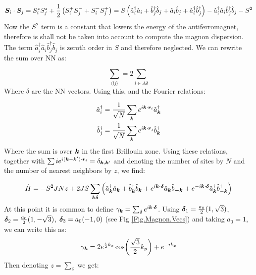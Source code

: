 \begin{align*}
\boldsymbol{S}_i\cdot\boldsymbol{S}_j = S_i^zS_j^z + \frac{1}{2}\left(S_i^+S_j^- + S_i^-S_j^+ \right) = S \left( \hat{a}^\dagger_i \hat{a}_i + \hat{b}^\dagger_j \hat{b}_j + \hat{a}_i\hat{b}_j + \hat{a}^\dagger_i\hat{b}^\dagger_j \right) - \hat{a}^\dagger_i \hat{a}_i\hat{b}^\dagger_j \hat{b}_j - S^2
\end{align*}
Now the $S^2$ term is a constant that lowers the energy of the antiferromagnet, therefore is shall not be taken into account to compute the magnon dispersion. The term $\hat{a}^\dagger_i \hat{a}_i\hat{b}^\dagger_j \hat{b}_j$ is zeroth order in $S$ and therefore neglected. We can rewrite the sum over NN as:

\begin{equation}
\sum_{\langle i j \rangle} = 2\sum_{i \in A \delta}
\end{equation}
Where $\delta$ are the NN vectors. Using this, and the Fourier relations:

\begin{align}
\hat{a}_i^\dagger &= \frac{1}{\sqrt{N}} \sum_{\boldsymbol{k}} e^{i \boldsymbol{k} \cdot \boldsymbol{r}_i} \hat{a}_{\boldsymbol{k}}^\dagger \\
\hat{b}_j^\dagger &= \frac{1}{\sqrt{N}} \sum_{\boldsymbol{k}} e^{i \boldsymbol{k} \cdot \boldsymbol{r}_j} \hat{b}_{\boldsymbol{k}}^\dagger
\end{align}
Where the sum is over $\boldsymbol{k}$ in the first Brillouin zone. Using these relations, together with $\sum{i} e^{i(\boldsymbol{k}-\boldsymbol{k}')\cdot\boldsymbol{r}_i} = \delta_{\boldsymbol{k}, \boldsymbol{k}'}$ and denoting the number of sites by $N$ and the number of nearest neighbors by $z$, we find:

\begin{equation}
\hat{H} = -S^2JNz + 2JS \sum_{\boldsymbol{k} \boldsymbol{\delta}} \left( \hat{a}^\dagger_{\boldsymbol{k}}\hat{a}_{\boldsymbol{k}} + \hat{b}^\dagger_{\boldsymbol{k}}\hat{b}_{\boldsymbol{k}} + e^{i\boldsymbol{k}\cdot\boldsymbol{\delta}}\hat{a}_{\boldsymbol{k}}\hat{b}_{\boldsymbol{-k}} + e^{-i \boldsymbol{k}\cdot\boldsymbol{\delta}}  \hat{a}^\dagger_{\boldsymbol{k}}\hat{b}^\dagger_{-\boldsymbol{k}} \right)
\end{equation}
At this point it is common to define $\gamma_{\boldsymbol{k}} = \sum_\delta e^{i \boldsymbol{k} \cdot \boldsymbol{\delta}}$. Using $\boldsymbol{\delta}_1=\frac{a_0}{2}(1,\sqrt{3})$, $\boldsymbol{\delta}_2=\frac{a_0}{2}(1,-\sqrt{3})$, $\boldsymbol{\delta}_3=a_0(-1,0)$ (see Fig \ref{Fig.Magnon.Vecs}) and taking $a_0=1$, we can write this as:
\begin{equation}
\gamma_{\boldsymbol{k}} = 2e^{\frac{i}{2}k_x}\cos(\frac{\sqrt{3}}{2}k_y)+e^{-ik_x}
\end{equation}
Then denoting $z = \sum_\delta$ we get:

